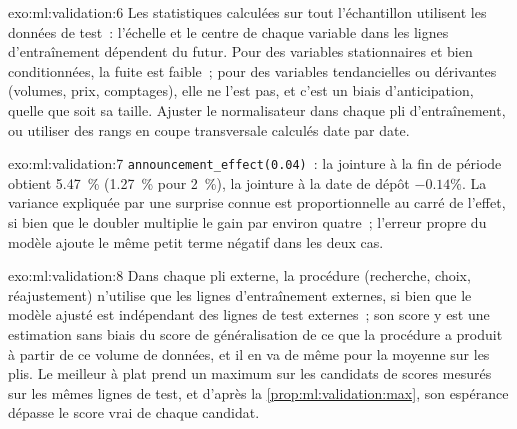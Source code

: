 \begin{solution}{exo:ml:validation:6}
Les statistiques calculées sur tout l'échantillon utilisent les données de test~: l'échelle et le centre de chaque variable dans les lignes d'entraînement dépendent du
futur. Pour des variables stationnaires et bien conditionnées, la fuite est faible~; pour des variables tendancielles ou dérivantes (volumes, prix,
comptages), elle ne l'est pas, et c'est un biais d'anticipation, quelle que soit sa taille. Ajuster le normalisateur dans chaque pli d'entraînement, ou utiliser
des rangs en coupe transversale calculés date par date.
\end{solution}

\begin{solution}{exo:ml:validation:7}
\texttt{announcement\_effect(0.04)}~: la jointure à la fin de période obtient 5.47~\% (1.27~\% pour 2~\%), la jointure à la date de dépôt $-0.14\%$.
La variance expliquée par une surprise connue est proportionnelle au carré de l'effet, si bien que le doubler multiplie
le gain par environ quatre~; l'erreur propre du modèle ajoute le même petit terme négatif dans les deux cas.
\end{solution}

\begin{solution}{exo:ml:validation:8}
Dans chaque pli externe, la procédure (recherche, choix, réajustement) n'utilise que les lignes d'entraînement externes, si bien que le modèle ajusté
est indépendant des lignes de test externes~; son score y est une estimation sans biais du score de généralisation de ce que la
procédure a produit à partir de ce volume de données, et il en va de même pour la moyenne sur les plis. Le meilleur à plat prend un maximum sur les candidats
de scores mesurés sur les mêmes lignes de test, et d'après la \cref{prop:ml:validation:max}, son espérance dépasse le
score vrai de chaque candidat.
\end{solution}

